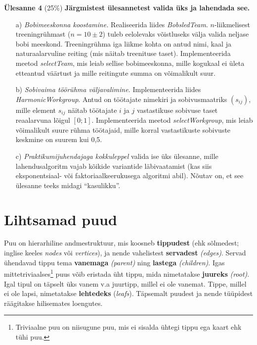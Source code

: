 \documentclass[a4paper]{article}
\begin{document}
\begin{problem}
\textbf{Ülesanne 4} (25\%)
\newline
\textbf{Järgmistest ülesannetest valida üks ja lahendada see.}

\begin{enumerate}
\item[a)] {\em Bobimeeskonna koostamine.} Realiseerida liides \textit{BobsledTeam}. $n$-liikmelisest
treeningrühmast ($n=10 \pm 2$) tuleb eelolevaks võistluseks välja valida
neljase bobi meeskond. Treeningrühma iga liikme kohta on antud nimi,
kaal ja naturaalarvuline reiting (mis näitab treenituse taset).
Implementeerida meetod \textit{selectTeam}, mis leiab sellise bobimeeskonna, mille kogukaal ei
ületa etteantud väärtust ja mille reitingute summa on võimalikult suur.

 \item[b)] {\em Sobivaima töörühma väljavalimine.} Implementeerida liides \textit{HarmonicWorkgroup}. Antud on töötajate
nimekiri ja sobivusmaatriks $(s_{ij})$, mille element $s_{ij}$ näitab töötajate
$i$ ja $j$ vastastikuse sobivuse taset reaalarvuna lõigul $[0;1]$.
Implementeerida meetod \textit{selectWorkgroup}, mis leiab võimalikult suure rühma töötajaid, mille
korral vastastikuste sobivuste keskmine on suurem kui 0{,}5.


 \item[c) ] {\em Praktikumijuhendajaga kokkuleppel} valida ise üks
ülesanne, mille lahendusalgoritm vajab kõikide variantide läbivaatamist
(kas siis eks\-po\-nent\-siaal- või faktoriaalkeerukusega algoritmi abil).
Nõutav on, et see ülesanne teeks midagi "`kasulikku"'.
\end{enumerate}
\end{problem}

\section*{Lihtsamad puud}

Puu on hierarhiline andmestruktuur, mis koosneb \textbf{tippudest} (ehk sõlmedest; inglise keeles \emph{nodes} või \emph{vertices}), ja nende vahelistest \textbf{servadest} \emph{(edges)}. Servad ühendavad tippu tema \textbf{vanemaga} \emph{(parent)} ning \textbf{lastega} \emph{(children)}. Igas mittetriviaalses\footnote{Triviaalne puu on niisugune puu, mis ei sisalda ühtegi tippu ega kaart ehk tühi puu.} puus võib eristada üht tippu, mida nimetatakse \textbf{juureks} \emph{(root)}. Igal tipul on täpselt üks vanem v.a juurtipp, millel ei ole vanemat. Tippe, millel ei ole lapsi, nimetatakse \textbf{lehtedeks} (\emph{leafs}). Täpsemalt puudest ja nende tüüpidest räägitakse hilisemates loengutes.
\end{document}
